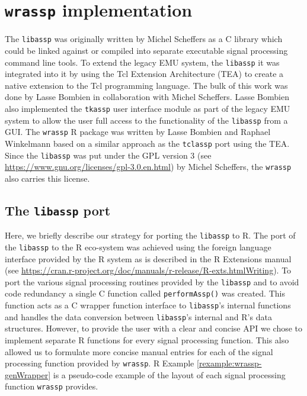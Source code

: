 \documentclass[]{book}
\theoremstyle{definition}
\theoremstyle{definition}
\theoremstyle{definition}
\theoremstyle{remark}
\begin{document}
\hypertarget{chap:wrassp_impl}{%
\chapter{\texorpdfstring{\texttt{wrassp}
implementation}{wrassp implementation}}\label{chap:wrassp_impl}}

The \texttt{libassp} was originally written by Michel Scheffers as a C
library which could be linked against or compiled into separate
executable signal processing command line tools. To extend the legacy
EMU system, the \texttt{libassp} it was integrated into it by using the
Tcl Extension Architecture (TEA) to create a native extension to the Tcl
programming language. The bulk of this work was done by Lasse Bombien in
collaboration with Michel Scheffers. Lasse Bombien also implemented the
\texttt{tkassp} user interface module as part of the legacy EMU system
to allow the user full access to the functionality of the
\texttt{libassp} from a GUI. The \texttt{wrassp} R package was written
by Lasse Bombien and Raphael Winkelmann based on a similar approach as
the \texttt{tclassp} port using the TEA. Since the \texttt{libassp} was
put under the GPL version 3 (see
\url{https://www.gnu.org/licenses/gpl-3.0.en.html}) by Michel Scheffers,
the \texttt{wrassp} also carries this license.

\hypertarget{the-libassp-port}{%
\section{\texorpdfstring{The \texttt{libassp}
port}{The libassp port}}\label{the-libassp-port}}

Here, we briefly describe our strategy for porting the \texttt{libassp}
to R. The port of the \texttt{libassp} to the R eco-system was achieved
using the foreign language interface provided by the R system as is
described in the R Extensions manual (see
\url{https://cran.r-project.org/doc/manuals/r-release/R-exts.htmlWriting}).
To port the various signal processing routines provided by the
\texttt{libassp} and to avoid code redundancy a single C function called
\texttt{performAssp()} was created. This function acts as a C wrapper
function interface to \texttt{libassp}'s internal functions and handles
the data conversion between \texttt{libassp}'s internal and R's data
structures. However, to provide the user with a clear and concise API we
chose to implement separate R functions for every signal processing
function. This also allowed us to formulate more concise manual entries
for each of the signal processing function provided by \texttt{wrassp}.
R Example \ref{rexample:wrassp-genWrapper} is a pseudo-code example of
the layout of each signal processing function \texttt{wrassp} provides.
\end{document}
